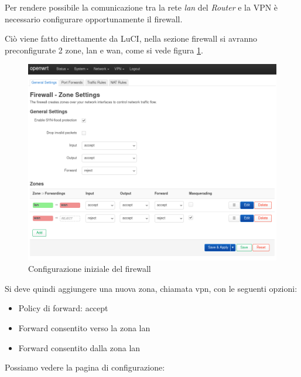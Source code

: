 Per rendere possibile la comunicazione tra la rete \textit{lan} del \textit{Router} e la VPN è necessario configurare opportunamente il firewall.

Ciò viene fatto direttamente da LuCI, nella sezione firewall si avranno preconfigurate 2 zone, lan e wan, come si vede figura \ref{fig:luci-firewall-init}.

\begin{figure}[H]
    \centering
    \includegraphics[width=0.9\linewidth]{immagini/LuCI_firewall_init1}
    \caption{Configurazione iniziale del firewall}
    \label{fig:luci-firewall-init}
\end{figure}

Si deve quindi aggiungere una nuova zona, chiamata vpn, con le seguenti opzioni:
\begin{itemize}
    \item Policy di forward: accept
    \item Forward consentito verso la zona lan
    \item Forward consentito dalla zona lan
\end{itemize}

Possiamo vedere la pagina di configurazione:



